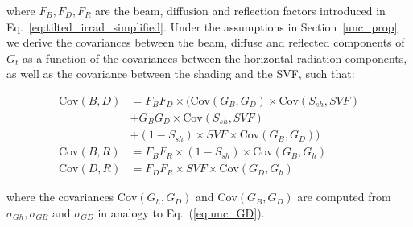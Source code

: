 where $F_{B}, F_{D}, F_{R}$ are the beam, diffusion and reflection factors introduced in Eq.~\ref{eq:tilted_irrad_simplified}. 
Under the assumptions in Section~\ref{unc_prop}, we derive the covariances between the beam, diffuse and reflected components of $G_t$ as a function of the covariances between the horizontal radiation components, as well as the covariance between the shading and the SVF, such that:

\begin{equation}
\begin{aligned}
\mathrm{Cov}(B, D) & = F_{B}  F_{D} \times (\mathrm{Cov}(G_B, G_D) \times \mathrm{Cov}(S_{sh}, \mathit{SVF}) \\
& + G_B  G_D \times \mathrm{Cov}(S_{sh}, \mathit{SVF}) \\
& + (1-S_{sh}) \times \mathit{SVF} \times \mathrm{Cov}(G_B, G_D)) \\
\mathrm{Cov}(B, R) & = F_{B}  F_{R} \times (1-S_{sh}) \times \mathrm{Cov}(G_B, G_h) \\
\mathrm{Cov}(D, R) & = F_{D}  F_{R} \times \mathit{SVF}  \times      \mathrm{Cov}(G_D, G_h) 
\end{aligned}
\end{equation}

where the covariances $\mathrm{Cov}(G_h, G_D)$ and $\mathrm{Cov}(G_B, G_D)$ are computed from $\sigma_{Gh}, \sigma_{GB}$ and $\sigma_{GD}$ in analogy to Eq.~(\ref{eq:unc_GD}).